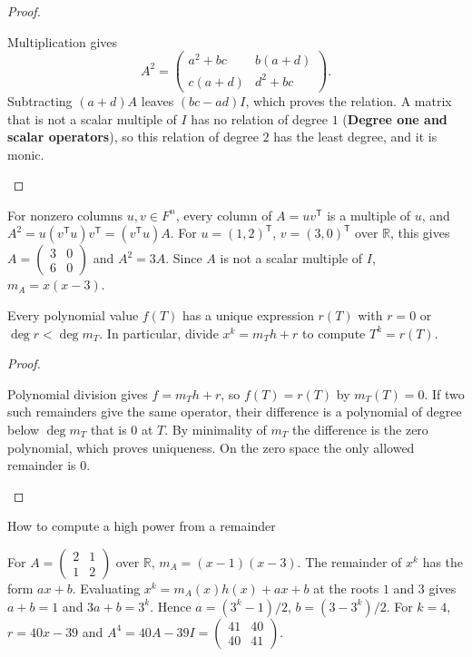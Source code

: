 \begin{prob}\begin{proof}\begin{steps}
\ii Multiplication gives
\[ A^2=\begin{pmatrix}a^2+bc&b(a+d)\\c(a+d)&d^2+bc\end{pmatrix}. \]
Subtracting $(a+d)A$ leaves $(bc-ad)I$, which proves the relation.
\ii A matrix that is not a scalar multiple of $I$ has no relation of degree $1$ (\textbf{Degree one and scalar operators}), so this relation of degree $2$ has the least degree, and it is monic.
\end{steps}\end{proof}\end{prob}
\begin{example*}
For nonzero columns $u,v\in F^n$, every column of $A=uv^{\mathsf T}$ is a multiple of $u$, and
$A^2=u(v^{\mathsf T}u)v^{\mathsf T}=(v^{\mathsf T}u)A$.
For $u=(1,2)^{\mathsf T}$, $v=(3,0)^{\mathsf T}$ over $\mathbb R$, this gives
$A=\left(\begin{smallmatrix}3&0\\6&0\end{smallmatrix}\right)$ and $A^2=3A$.
Since $A$ is not a scalar multiple of $I$, $m_A=x(x-3)$.
\end{example*}
\begin{proposition*}
Every polynomial value $f(T)$ has a unique expression $r(T)$ with $r=0$ or $\deg r<\deg m_T$. In particular, divide $x^k=m_Th+r$ to compute $T^k=r(T)$.
\end{proposition*}
\begin{prob}\begin{proof}\begin{steps}
\ii Polynomial division gives $f=m_Th+r$, so $f(T)=r(T)$ by $m_T(T)=0$.
\ii If two such remainders give the same operator, their difference is a polynomial of degree below $\deg m_T$ that is $0$ at $T$. By minimality of $m_T$ the difference is the zero polynomial, which proves uniqueness. On the zero space the only allowed remainder is $0$.
\end{steps}\end{proof}\end{prob}
\begin{methodbox}{How to compute a high power from a remainder}
\begin{enumerate}[label=\arabic*.,leftmargin=1.5em,itemsep=2pt,topsep=2pt]
\ii For $A=\left(\begin{smallmatrix}2&1\\1&2\end{smallmatrix}\right)$ over $\mathbb R$, $m_A=(x-1)(x-3)$. The remainder of $x^k$ has the form $ax+b$. Evaluating $x^k=m_A(x)h(x)+ax+b$ at the roots $1$ and $3$ gives $a+b=1$ and $3a+b=3^k$.
\ii Hence $a=(3^k-1)/2$, $b=(3-3^k)/2$. For $k=4$, $r=40x-39$ and $A^4=40A-39I=\left(\begin{smallmatrix}41&40\\40&41\end{smallmatrix}\right)$.
\end{enumerate}
\end{methodbox}
